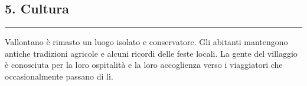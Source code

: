 \subsection{5. Cultura}\label{cultura}

\begin{center}\rule{0.5\linewidth}{0.5pt}\end{center}

Vallontano è rimasto un luogo isolato e conservatore. Gli abitanti
mantengono antiche tradizioni agricole e alcuni ricordi delle feste
locali. La gente del villaggio è conosciuta per la loro ospitalità e la
loro accoglienza verso i viaggiatori che occasionalmente passano di lì.
